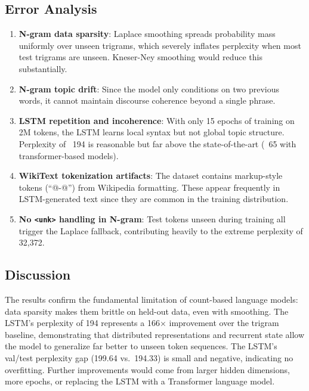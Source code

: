 \documentclass[12pt,a4paper]{article}
\begin{document}
\subsection{Error Analysis}

\begin{enumerate}
    \item \textbf{N-gram data sparsity}: Laplace smoothing spreads probability mass uniformly over unseen trigrams, which severely inflates perplexity when most test trigrams are unseen. Kneser-Ney smoothing would reduce this substantially.
    \item \textbf{N-gram topic drift}: Since the model only conditions on two previous words, it cannot maintain discourse coherence beyond a single phrase.
    \item \textbf{LSTM repetition and incoherence}: With only 15 epochs of training on 2M tokens, the LSTM learns local syntax but not global topic structure. Perplexity of ~194 is reasonable but far above the state-of-the-art (~65 with transformer-based models).
    \item \textbf{WikiText tokenization artifacts}: The dataset contains markup-style tokens (``@-@'') from Wikipedia formatting. These appear frequently in LSTM-generated text since they are common in the training distribution.
    \item \textbf{No \texttt{<unk>} handling in N-gram}: Test tokens unseen during training all trigger the Laplace fallback, contributing heavily to the extreme perplexity of 32{,}372.
\end{enumerate}

\subsection{Discussion}

The results confirm the fundamental limitation of count-based language models: data sparsity makes them brittle on held-out data, even with smoothing. The LSTM's perplexity of 194 represents a 166$\times$ improvement over the trigram baseline, demonstrating that distributed representations and recurrent state allow the model to generalize far better to unseen token sequences. The LSTM's val/test perplexity gap (199.64 vs.\ 194.33) is small and negative, indicating no overfitting. Further improvements would come from larger hidden dimensions, more epochs, or replacing the LSTM with a Transformer language model.

\end{document}
